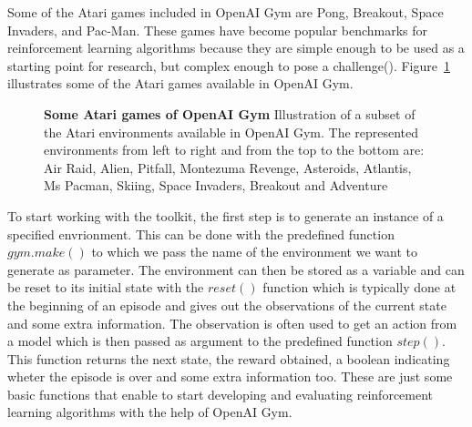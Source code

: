Some of the Atari games included in OpenAI Gym are Pong, Breakout, Space Invaders, and Pac-Man. These games have become popular benchmarks for reinforcement learning algorithms because they are simple enough to be used as a starting point for research, but complex enough to pose a challenge(\cite{brockman_openai_2016}). Figure~\ref{fig:atari_games} illustrates some of the Atari games available in OpenAI Gym.

\begin{figure}[!ht]
\centering
{}
\caption[Atari games of OpenAI Gym]{
  \textbf{Some Atari games of OpenAI Gym}
  Illustration of a subset of the Atari environments available in OpenAI Gym. The represented environments from left to right and from the top to the bottom are: Air Raid, Alien, Pitfall, Montezuma Revenge, Asteroids, Atlantis, Ms Pacman, Skiing, Space Invaders, Breakout and Adventure
 }
\label{fig:atari_games}
\end{figure}


To start working with the toolkit, the first step is to generate an instance of a specified envrionment. This can be done with the predefined function $gym.make()$ to which we pass the name of the environment we want to generate as parameter. The environment can then be stored as a variable and can be reset to its initial state with the $reset()$ function which is typically done at the beginning of an episode and gives out the observations of the current state and some extra information. The observation is often used to get an action from a model which is then passed as argument to the predefined function $step()$. This function returns the next state, the reward obtained, a boolean indicating wheter the episode is over and some extra information too. These are just some basic functions that enable to start developing and evaluating reinforcement learning algorithms with the help of OpenAI Gym.

